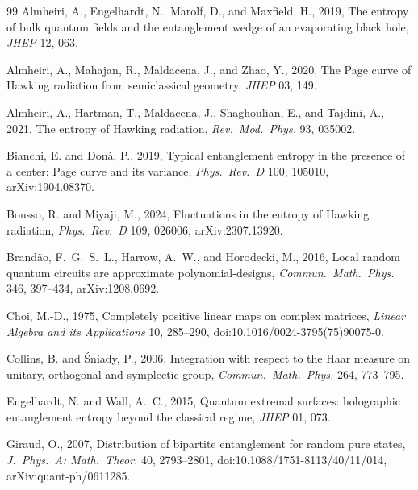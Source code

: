 \documentclass[11pt,letterpaper]{article}
\theoremstyle{plain}
\theoremstyle{definition}
\theoremstyle{remark}
\begin{document}
\begin{thebibliography}{99}
Almheiri, A., Engelhardt, N., Marolf, D., and Maxfield, H., 2019, The entropy of bulk quantum fields and the entanglement wedge of an evaporating black hole, \textit{JHEP} 12, 063.

Almheiri, A., Mahajan, R., Maldacena, J., and Zhao, Y., 2020, The Page curve of Hawking radiation from semiclassical geometry, \textit{JHEP} 03, 149.

Almheiri, A., Hartman, T., Maldacena, J., Shaghoulian, E., and Tajdini, A., 2021, The entropy of Hawking radiation, \textit{Rev.\ Mod.\ Phys.} 93, 035002.

Bianchi, E. and Don\`{a}, P., 2019, Typical entanglement entropy in the presence of a center: Page curve and its variance, \textit{Phys.\ Rev.\ D} 100, 105010, arXiv:1904.08370.

Bousso, R. and Miyaji, M., 2024, Fluctuations in the entropy of Hawking radiation, \textit{Phys.\ Rev.\ D} 109, 026006, arXiv:2307.13920.

Brand\~{a}o, F.~G.~S.~L., Harrow, A.~W., and Horodecki, M., 2016,
Local random quantum circuits are approximate polynomial-designs,
\textit{Commun.\ Math.\ Phys.} 346, 397--434, arXiv:1208.0692.

Choi, M.-D., 1975, Completely positive linear maps on complex matrices,
\textit{Linear Algebra and its Applications} 10, 285--290,
doi:10.1016/0024-3795(75)90075-0.

Collins, B. and \'{S}niady, P., 2006, Integration with respect to the
Haar measure on unitary, orthogonal and symplectic group,
\textit{Commun.\ Math.\ Phys.} 264, 773--795.

Engelhardt, N. and Wall, A.~C., 2015, Quantum extremal surfaces: holographic entanglement entropy beyond the classical regime, \textit{JHEP} 01, 073.

Giraud, O., 2007, Distribution of bipartite entanglement for random pure states,
\textit{J.\ Phys.\ A: Math.\ Theor.} 40, 2793--2801,
doi:10.1088/1751-8113/40/11/014, arXiv:quant-ph/0611285.


\end{thebibliography}
\end{document}
